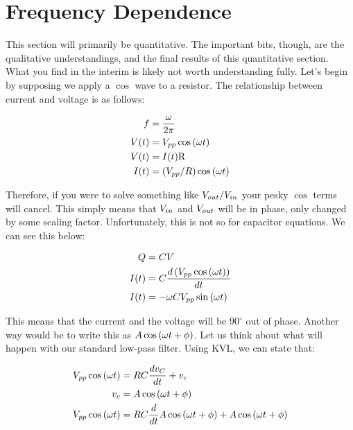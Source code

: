 \section{Frequency Dependence}
This section will primarily be quantitative. The important bits, though, are the qualitative understandings, and the final results of this quantitative section. What you find in the interim is likely not worth understanding fully. Let's begin by supposing we apply a $\cos$ wave to a resistor. The relationship between current and voltage is as follows:

\begin{equation} \label{freq1}
\begin{split}
f &= \frac{\omega}{2\pi}\\
V(t) &= { V}_{ pp} \cos\left(\omega t\right) \\
V(t) &= I(t)\mathrm{R} \\
I(t) & = \left({ V}_{ pp} / {R}\right) \cos\left(\omega t\right)\\
\end{split}
\end{equation}\newline

Therefore, if you were to solve something like ${V}_{out} / {V}_{in}$ your pesky $\cos$ terms will cancel. This simply means that ${V}_{in}$ and ${V}_{out}$ will be in phase, only changed by some scaling factor. Unfortunately, this is not so for capacitor equations. We can see this below: 

\begin{equation} \label{freq2}
\begin{split}
Q &= CV \\
I(t) &= C \frac{d \left({ V}_{ pp} \cos\left(\omega t\right)\right)}{dt} \\
I(t) &= - \omega C { V}_{ pp} \sin \left(\omega t\right) \\
\end{split}
\end{equation}\newline

This means that the current and the voltage will be $90^{\circ}$ out of phase. Another way would be to write this as $A \cos \left(\omega t + \phi\right)$. Let us think about what will happen with our standard low-pass filter. Using KVL, we can state that: 

\begin{equation} \label{freq3}
\begin{split}
{ V}_{ pp} \cos\left(\omega t\right) &= RC\frac{dv_C}{dt} + v_c \\ 
v_c &= A \cos \left(\omega t + \phi\right) \\ 
{ V}_{ pp} \cos\left(\omega t\right) &= RC\frac{d}{dt}A \cos \left(\omega t + \phi\right) + A \cos \left(\omega t + \phi\right) \\
\end{split}
\end{equation}



